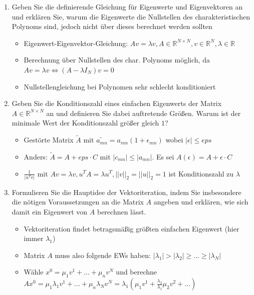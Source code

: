 \documentclass[]{article}
\newcommand*{\real}{\ensuremath{\mathbb{R}}}
\begin{document}
	\begin{enumerate}
		\item Geben Sie die definierende Gleichung für Eigenwerte und Eigenvektoren an und erklären Sie, warum die Eigenwerte die Nullstellen des charakteristischen Polynoms sind, jedoch nicht über dieses berechnet werden sollten
			\begin{itemize}
				\item Eigenwert-Eigenvektor-Gleichung: $Av = \lambda v, A \in \real^{N \times N}, v \in \real^N, \lambda \in \real$
				\item Berechnung über Nullstellen des char. Polynoms möglich, da $Av = \lambda v  \Leftrightarrow (A- \lambda I_N)v = 0$
				\item Nullstellengleichung bei Polynomen sehr schlecht konditioniert
			\end{itemize}
		\item Geben Sie die Konditionszahl eines einfachen Eigenwerts der Matrix $A \in \real^{N \times N}$ an und definieren Sie dabei auftretende Größen. Warum ist der minimale Wert der Konditionszahl größer gleich $1$?
			\begin{itemize}
				\item Gestörte Matrix $\tilde{A}$ mit $\tilde{a_{mn}} = a_{mn}(1 + \epsilon_{mn})$ wobei $|\epsilon| \leq eps$
				\item Anders: $\tilde{A} = A + eps\cdot C$ mit $|c_{mn}| \leq |a_{mn}|$. Es sei $A(\epsilon) = A + \epsilon \cdot C$
				\item $\frac{1}{|u^Tv|}$ mit $Av = \lambda v, u^TA = \lambda u^T, ||v||_2 = ||u||_2 = 1$ ist Konditionszahl zu $\lambda$
			\end{itemize}
		\item Formulieren Sie die Hauptidee der Vektoriteration, indem Sie insbesondere die nötigen Voraussetzungen an die Matrix $A$ angeben und erklären, wie sich damit ein Eigenwert von $A$ berechnen lässt.
			\begin{itemize}
				\item Vektoriteration findet betragsmäßig größten einfachen Eigenwert (hier immer $\lambda_1$)
				\item Matrix $A$ muss also folgende EWs haben: $|\lambda_1| > |\lambda_2| \geq \dots \geq |\lambda_N|$
				\item Wähle $x^0 = \mu_1v^1 + \dots + \mu_nv^N$ und berechne $Ax^0 = \mu_1\lambda_1v^1 + \dots + \mu_n\lambda_Nv^N = \lambda_1 ( \mu_1v^1 + \frac{\lambda_2}{\lambda_1}\mu_2v^2 + \dots)$

\end{itemize}
\end{enumerate}
\end{document}
